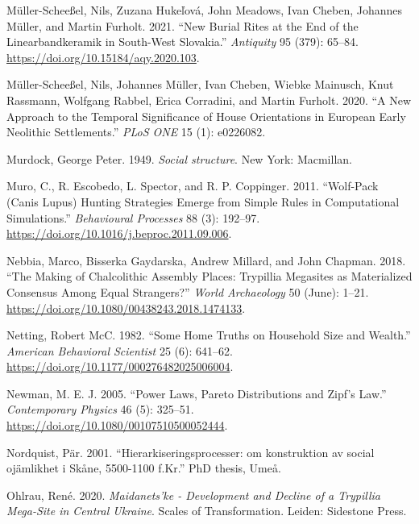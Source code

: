 \documentclass[
  12pt,
  a4paper, twoside]{book}
\newlength{\cslhangindent}
\newlength{\cslentryspacingunit} %
\newenvironment{CSLReferences}[2] %
 {%
  \setlength{\parindent}{0pt}
  \ifodd #1
  \let\oldpar\par
  \def\par{\hangindent=\cslhangindent\oldpar}
  \fi
  \setlength{\parskip}{#2\cslentryspacingunit}
 }%
 {}
\begin{document}
\begin{CSLReferences}{1}{0}
\leavevmode{}%
Müller-Scheeßel, Nils, Zuzana Hukeľová, John Meadows, Ivan Cheben, Johannes Müller, and Martin Furholt. 2021. {``New Burial Rites at the End of the {Linearbandkeramik} in South-West {Slovakia}.''} \emph{Antiquity} 95 (379): 65--84. \url{https://doi.org/10.15184/aqy.2020.103}.

\leavevmode{}%
Müller-Scheeßel, Nils, Johannes Müller, Ivan Cheben, Wiebke Mainusch, Knut Rassmann, Wolfgang Rabbel, Erica Corradini, and Martin Furholt. 2020. {``A New Approach to the Temporal Significance of House Orientations in European Early Neolithic Settlements.''} \emph{PLoS ONE} 15 (1): e0226082.

\leavevmode{}%
Murdock, George Peter. 1949. \emph{Social structure}. New York: Macmillan.

\leavevmode{}%
Muro, C., R. Escobedo, L. Spector, and R. P. Coppinger. 2011. {``Wolf-Pack (Canis Lupus) Hunting Strategies Emerge from Simple Rules in Computational Simulations.''} \emph{Behavioural Processes} 88 (3): 192--97. \url{https://doi.org/10.1016/j.beproc.2011.09.006}.

\leavevmode{}%
Nebbia, Marco, Bisserka Gaydarska, Andrew Millard, and John Chapman. 2018. {``The Making of Chalcolithic Assembly Places: Trypillia Megasites as Materialized Consensus Among Equal Strangers?''} \emph{World Archaeology} 50 (June): 1--21. \url{https://doi.org/10.1080/00438243.2018.1474133}.

\leavevmode{}%
Netting, Robert McC. 1982. {``Some Home Truths on Household Size and Wealth.''} \emph{American Behavioral Scientist} 25 (6): 641--62. \url{https://doi.org/10.1177/000276482025006004}.

\leavevmode{}%
Newman, M. E. J. 2005. {``Power Laws, Pareto Distributions and Zipf's Law.''} \emph{Contemporary Physics} 46 (5): 325--51. \url{https://doi.org/10.1080/00107510500052444}.

\leavevmode{}%
Nordquist, Pär. 2001. {``Hierarkiseringsprocesser: om konstruktion av social ojämlikhet i Skåne, 5500-1100 f.Kr.''} PhD thesis, Umeå.

\leavevmode{}%
Ohlrau, René. 2020. \emph{Maidanets'ke - Development and Decline of a Trypillia Mega-Site in Central Ukraine}. Scales of Transformation. Leiden: Sidestone Press.


\end{CSLReferences}
\end{document}
